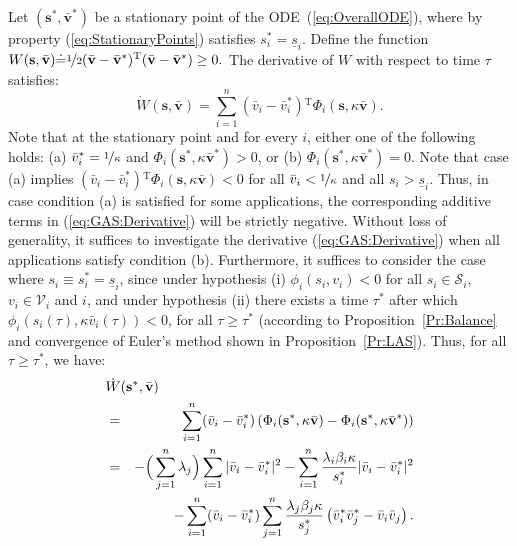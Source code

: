 \documentclass[letter,11pt]{article}
\begin{document}
Let $({\mathbf{s}}^*,{\bar{\mathbf{v}}}^*)$ be a stationary point of the ODE~(\ref{eq:OverallODE}), where by property (\ref{eq:StationaryPoints}) satisfies $s_i^* = \underline{s}_i$. Define the function
$W({\mathbf{s}},{\bar{\mathbf{v}}}) {\doteq} \nicefrac{1}{2}({\bar{\mathbf{v}}}-{\bar{\mathbf{v}}}^*){^{\mathrm T}}({\bar{\mathbf{v}}}-{\bar{\mathbf{v}}}^*) \geq 0.$
The derivative of $W$ with respect to time $\tau$ satisfies:
\begin{equation}	\label{eq:GAS:Derivative}
  \dot{W}({\mathbf{s}},{\bar{\mathbf{v}}})  = \sum_{i=1}^{n}({\bar{v}}_i-{\bar{v}}_i^*){^{\mathrm T}} \Phi_i({\mathbf{s}},\kappa{\bar{\mathbf{v}}}).
\end{equation}
Note that at the stationary point and for every $i$, either one of the following holds: (a) ${\bar{v}}_i^*=\nicefrac{1}{\kappa}$ and $\Phi_i({\mathbf{s}}^*,\kappa{\bar{\mathbf{v}}}^*)>0$, or (b) $\Phi_i({\mathbf{s}}^*,\kappa{\bar{\mathbf{v}}}^*)=0$. Note that case (a) implies $({\bar{v}}_i-{\bar{v}}_i^*){^{\mathrm T}} \Phi_i({\mathbf{s}},\kappa{\bar{\mathbf{v}}}) < 0$ for all ${\bar{v}}_i<\nicefrac{1}{\kappa}$ and all $s_i>\underline{s}_i$. Thus, in case condition (a) is satisfied for some applications, the corresponding additive terms in (\ref{eq:GAS:Derivative}) will be strictly negative. Without loss of generality, it suffices to investigate the derivative (\ref{eq:GAS:Derivative}) when all applications satisfy condition (b). Furthermore, it suffices to consider the case where $s_i\equiv s_i^*=\underline{s}_i$, since under hypothesis (i) $\phi_i(s_i,v_i) < 0$ for all $s_i\in\mathcal{S}_i$, $v_i\in{\mathcal{V}}_i$ and $i$, and under hypothesis (ii) there exists a time $\tau^*$ after which $\phi_i(s_i(\tau),\kappa{\bar{v}}_i(\tau))<0$, for all $\tau\geq{\tau}^*$ (according to Proposition~\ref{Pr:Balance} and convergence of Euler's method shown in Proposition~\ref{Pr:LAS}). Thus, for all $\tau\geq{\tau^*}$, we have:
\begin{eqnarray*}
  \lefteqn{\dot{W}({\mathbf{s}}^*,{\bar{\mathbf{v}}})}\cr & = & \sum_{i=1}^{n}({\bar{v}}_i-{\bar{v}}_i^*) \left(\Phi_i({\mathbf{s}}^*,\kappa{\bar{\mathbf{v}}}) - \Phi_i({\mathbf{s}}^*,\kappa{\bar{\mathbf{v}}}^*)\right) \cr 
  & = & -\Big(\sum_{j=1}^{n}\lambda_j\Big)\sum_{i=1}^{n}|{\bar{v}}_i-{\bar{v}}_i^*|^2 -\sum_{i=1}^{n}\frac{\lambda_i\beta_i\kappa}{s_i^*}|{\bar{v}}_i-{\bar{v}}_i^*|^2 \cr
  && -\sum_{i=1}^{n}({\bar{v}}_i-{\bar{v}}_i^*)\sum_{j=1}^{n}\frac{\lambda_j\beta_j\kappa}{s_j^*} \left({\bar{v}}_i^*{\bar{v}}_j^* - {\bar{v}}_i{\bar{v}}_j\right).
\end{eqnarray*}
\end{document}
